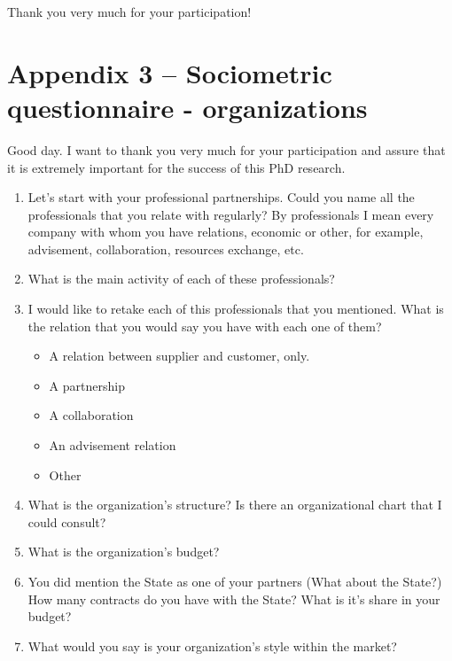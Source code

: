 \documentclass[a4paper, 12pt, openright, oneside, german, french, brazil, english]{abntex2}
\begin{document}
        Thank you very much for your participation!


        \newpage

        \chapter*[Questionnaire - organizations]{Appendix 3 -- Sociometric questionnaire - organizations}

        Good day. I want to thank you very much for your participation and assure that it is extremely important for the success of this PhD research.

        \vspace{1cm}
        \begin{enumerate}
        \item Let's start with your professional partnerships. Could you name all the professionals that you relate with regularly? By professionals I mean every company with whom you have relations, economic or other, for example, advisement, collaboration, resources exchange, etc.

        \item What is the main activity of each of these professionals?

        \item I would like to retake each of this professionals that you mentioned. What is the relation that you would say you have with each one of them?
          \begin{itemize}
          \item A relation between supplier and customer, only.
          \item A partnership
          \item A collaboration
          \item An advisement relation
          \item Other
          \end{itemize}

        \item What is the organization's structure? Is there an organizational chart that I could consult?
        \item What is the organization's budget?     
          
        \item You did mention the State as one of your partners (What about the State?) How many contracts do you have with the State? What is it's share in your budget?
        \item What would you say is your organization's style within the market?


\end{enumerate}
\end{document}
